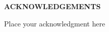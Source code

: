 \begin{center}
    \large{\textbf{ACKNOWLEDGEMENTS}}
\end{center}
\noindent Place your acknowledgment here 